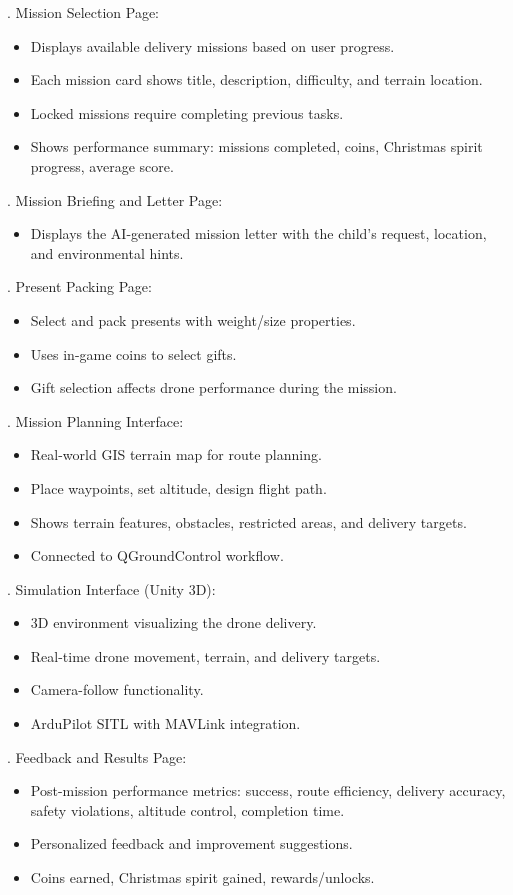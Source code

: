 . Mission Selection Page:
\begin{itemize}
    \item Displays available delivery missions based on user progress.
    \item Each mission card shows title, description, difficulty, and terrain location.
    \item Locked missions require completing previous tasks.
    \item Shows performance summary: missions completed, coins, Christmas spirit progress, average score.
\end{itemize}

. Mission Briefing and Letter Page:
\begin{itemize}
    \item Displays the AI-generated mission letter with the child's request, location, and environmental hints.
\end{itemize}

. Present Packing Page:
\begin{itemize}
    \item Select and pack presents with weight/size properties.
    \item Uses in-game coins to select gifts.
    \item Gift selection affects drone performance during the mission.
\end{itemize}

. Mission Planning Interface:
\begin{itemize}
    \item Real-world GIS terrain map for route planning.
    \item Place waypoints, set altitude, design flight path.
    \item Shows terrain features, obstacles, restricted areas, and delivery targets.
    \item Connected to QGroundControl workflow.
\end{itemize}

. Simulation Interface (Unity 3D):
\begin{itemize}
    \item 3D environment visualizing the drone delivery.
    \item Real-time drone movement, terrain, and delivery targets.
    \item Camera-follow functionality.
    \item ArduPilot SITL with MAVLink integration.
\end{itemize}

. Feedback and Results Page:
\begin{itemize}
    \item Post-mission performance metrics: success, route efficiency, delivery accuracy, safety violations, altitude control, completion time.
    \item Personalized feedback and improvement suggestions.
    \item Coins earned, Christmas spirit gained, rewards/unlocks.
\end{itemize}

